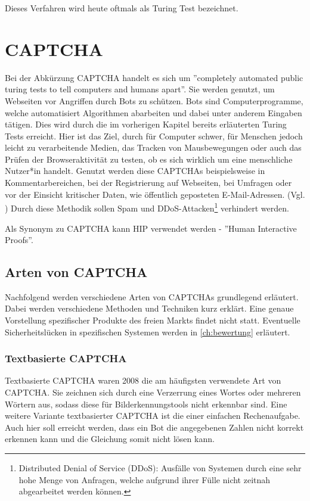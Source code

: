 Dieses Verfahren wird heute oftmals als Turing Test bezeichnet. 

\section{CAPTCHA}
\label{ch:basics:captcha}
Bei der Abkürzung CAPTCHA handelt es sich um ''completely automated public turing tests to tell computers and humans apart''. 
Sie werden genutzt, um Webseiten vor Angriffen durch Bots zu schützen. 
Bots sind Computerprogramme, welche automatisiert Algorithmen abarbeiten und dabei unter anderem Eingaben tätigen.
Dies wird durch die im vorherigen Kapitel bereits erläuterten Turing Tests erreicht. 
Hier ist das Ziel, durch für Computer schwer, für Menschen jedoch leicht zu verarbeitende Medien, das Tracken von Mausbewegungen
oder auch das Prüfen der Browseraktivität zu testen, ob es sich wirklich um eine menschliche Nutzer*in handelt.
Genutzt werden diese CAPTCHAs beispielsweise in Kommentarbereichen, bei der Registrierung auf Webseiten,
bei Umfragen oder vor der Einsicht kritischer Daten, wie öffentlich geposteten E-Mail-Adressen. (Vgl. \cite{moradi})
Durch diese Methodik sollen Spam und 
DDoS-Attacken\footnote[1]{Distributed Denial of Service (DDoS): Ausfälle von Systemen durch eine sehr hohe Menge von Anfragen, 
welche aufgrund ihrer Fülle nicht zeitnah abgearbeitet werden können.} 
verhindert werden.

Als Synonym zu CAPTCHA kann HIP verwendet werden - ''Human Interactive Proofs''. 

\subsection{Arten von CAPTCHA}
\label{ch:basics:captcha:arten}
Nachfolgend werden verschiedene Arten von CAPTCHAs grundlegend erläutert.
Dabei werden verschiedene Methoden und Techniken kurz erklärt. 
Eine genaue Vorstellung spezifischer Produkte des freien Markts findet nicht statt.
Eventuelle Sicherheitslücken in spezifischen Systemen werden in \autoref{ch:bewertung} erläutert.

\subsubsection*{Textbasierte CAPTCHA}
Textbasierte CAPTCHA waren 2008 die am häufigsten verwendete Art von CAPTCHA.
Sie zeichnen sich durch eine Verzerrung eines Wortes oder mehreren Wörtern aus, sodass diese für Bilderkennungstools nicht erkennbar sind.
Eine weitere Variante textbasierter CAPTCHA ist die einer einfachen Rechenaufgabe. 
Auch hier soll erreicht werden, dass ein Bot die angegebenen Zahlen nicht korrekt erkennen kann und die Gleichung somit nicht lösen kann. \cite[p.1]{usabilityofcaptchas} \cite[p.75]{surveyofresearch} \cite{shinde2018DIFFERENTTO} %


